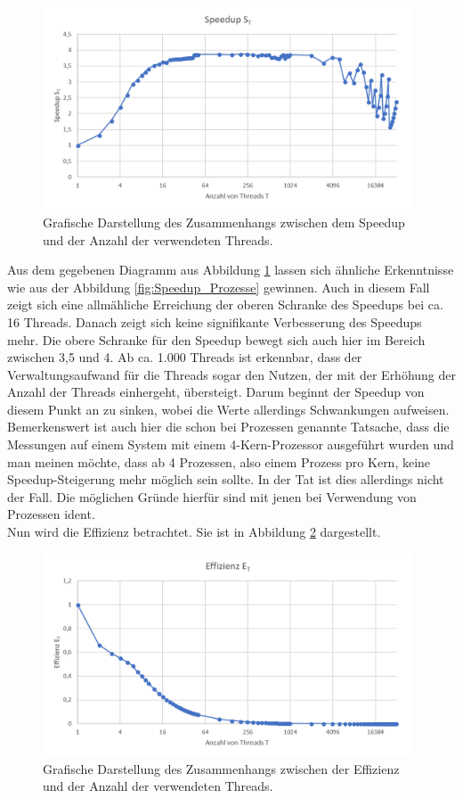 \begin{description}
						\begin{figure}
							\centering	
							\includegraphics[width=11cm]{Abbildungen/Speedup_Threads.png}
							\caption{Grafische Darstellung des Zusammenhangs zwischen dem Speedup und der Anzahl der verwendeten Threads.}
							\label{fig:Speedup_Threads}
						\end{figure}
						
						Aus dem gegebenen Diagramm aus Abbildung \ref{fig:Speedup_Threads} lassen sich ähnliche Erkenntnisse wie aus der Abbildung \ref{fig:Speedup_Prozesse} gewinnen. Auch in diesem Fall zeigt sich eine allmähliche Erreichung der oberen Schranke des Speedups bei ca. 16 Threads. Danach zeigt sich keine signifikante Verbesserung des Speedups mehr. Die obere Schranke für den Speedup bewegt sich auch hier im Bereich zwischen 3,5 und 4. Ab ca. 1.000 Threads ist erkennbar, dass der Verwaltungsaufwand für die Threads sogar den Nutzen, der mit der Erhöhung der Anzahl der Threads einhergeht, übersteigt. Darum beginnt der Speedup von diesem Punkt an zu sinken, wobei die Werte allerdings Schwankungen aufweisen.\\
						Bemerkenswert ist auch hier die schon bei Prozessen genannte Tatsache, dass die Messungen auf einem System mit einem 4-Kern-Prozessor ausgeführt wurden und man meinen möchte, dass ab 4 Prozessen, also einem Prozess pro Kern, keine Speedup-Steigerung mehr möglich sein sollte. In der Tat ist dies allerdings nicht der Fall. Die möglichen Gründe hierfür sind mit jenen bei Verwendung von Prozessen ident.\\
						Nun wird die Effizienz betrachtet. Sie ist in Abbildung \ref{fig:Effizienz_Threads} dargestellt.
						
						\begin{figure}
							\centering	
							\includegraphics[width=11cm]{Abbildungen/Effizienz_Threads.png}
							\caption{Grafische Darstellung des Zusammenhangs zwischen der Effizienz und der Anzahl der verwendeten Threads.}
							\label{fig:Effizienz_Threads}
						\end{figure}
						

\end{description}

